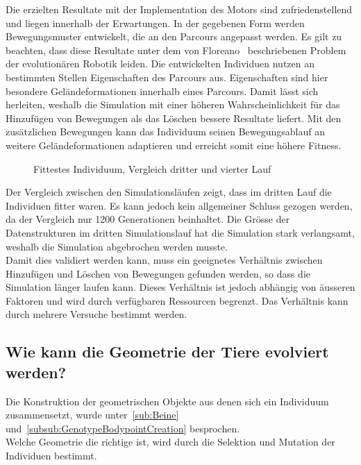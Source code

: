       \smallskip

      Die erzielten Resultate mit der Implementation des Motors sind zufriedenstellend und
      liegen innerhalb der Erwartungen.
      In der gegebenen Form werden Bewegungsmuster entwickelt, die an den Parcours angepasst werden.
      Es gilt zu beachten, dass diese Resultate unter dem von Floreano~\cite{Floreano2010} beschriebenen Problem
      der evolutionären Robotik leiden.
      Die entwickelten Individuen nutzen an bestimmten Stellen Eigenschaften des Parcours aus.
      Eigenschaften sind hier besondere Geländeformationen innerhalb eines Parcours.
      Damit lässt sich herleiten, weshalb die Simulation mit einer höheren Wahrscheinlichkeit
      für das Hinzufügen von Bewegungen als das Löschen bessere Resultate liefert.
      Mit den zusätzlichen Bewegungen kann das Individuum seinen Bewegungsablauf
      an weitere Geländeformationen adaptieren und erreicht somit eine höhere Fitness.

      \begin{figure}[H]
        \centering
        
        \caption{Fittestes Individuum, Vergleich dritter und vierter Lauf}
      \end{figure}

      Der Vergleich zwischen den Simulationsläufen zeigt, dass im dritten Lauf die Individuen fitter waren.
      Es kann jedoch kein allgemeiner Schluss gezogen werden, da der Vergleich nur 1200 Generationen beinhaltet.
      Die Grösse der Datenstrukturen im dritten Simulationslauf hat die Simulation stark verlangsamt,
      weshalb die Simulation abgebrochen werden musste.
      \\
      Damit dies validiert werden kann,
      muss ein geeignetes Verhältnis zwischen Hinzufügen und Löschen von Bewegungen gefunden werden,
      so dass die Simulation länger laufen kann.
      Dieses Verhältnis ist jedoch abhängig von äusseren Faktoren und wird durch verfügbaren Ressourcen begrenzt.
      Das Verhältnis kann durch mehrere Versuche bestimmt werden.

    \subsection{Wie kann die Geometrie der Tiere evolviert werden?}

      Die Konstruktion der geometrischen Objekte aus denen sich ein Individuum zusammensetzt,
      wurde unter~\vref{sub:Beine} und~\vref{subsub:GenotypeBodypointCreation} besprochen.
      \\
      Welche Geometrie die richtige ist, wird durch die Selektion und Mutation der Individuen bestimmt.


